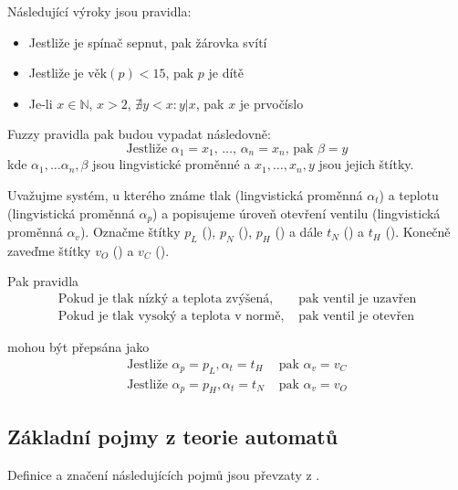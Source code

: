 \documentclass[a4paper,10pt]{article}
\begin{document}
\begin{example}
 Následující výroky jsou \ifthen pravidla:
 \begin{itemize}
  \item Jestliže je spínač sepnut, pak žárovka svítí
  \item Jestliže je $\text{věk}(p) < 15$, pak $p$ je dítě
  \item Je-li $x \in \mathbb{N}$, $x > 2$, $\nexists y < x: y|x$, pak $x$ je prvočíslo
 \end{itemize}
\end{example}

Fuzzy \ifthen pravidla pak budou vypadat následovně:
$$
 \text{Jestliže $\alpha_1 = x_1$, $\dots$, $\alpha_n = x_n$, pak $\beta = y$}
$$
kde $\alpha_1, \dots \alpha_n, \beta$ jsou lingvistické proměnné a $x_1, \dots, x_n, y$ jsou jejich štítky.


\begin{example}
 Uvažujme systém, u kterého známe tlak (lingvistická proměnná $\alpha_t$) a teplotu (lingvistická proměnná $\alpha_p$) a popisujeme úroveň otevření ventilu (lingvistická proměnná $\alpha_v$). 
 Označme štítky $p_L$ (), $p_N$ (), $p_H$ () a dále $t_N$ () a $t_H$ (). Konečně zaveďme štítky $v_O$ () a $v_C$ (). 
 
 Pak pravidla
 \begin{align*}
  \text{Pokud je tlak nízký a teplota zvýšená, }&\text{pak ventil je uzavřen} \\
  \text{Pokud je tlak vysoký a teplota v normě, }&\text{pak ventil je otevřen}
 \end{align*}

 mohou být přepsána jako
 \begin{align*}
  \text{Jestliže } \alpha_p = p_L, \alpha_t = t_H &\text{ pak } \alpha_v = v_C \\
  \text{Jestliže } \alpha_p = p_H, \alpha_t = t_N &\text{ pak } \alpha_v = v_O 
 \end{align*}
\end{example}


\subsection{Základní pojmy z teorie automatů}
Definice a značení následujících pojmů jsou převzaty z \cite{Koz-AutComp}.
\end{document}
